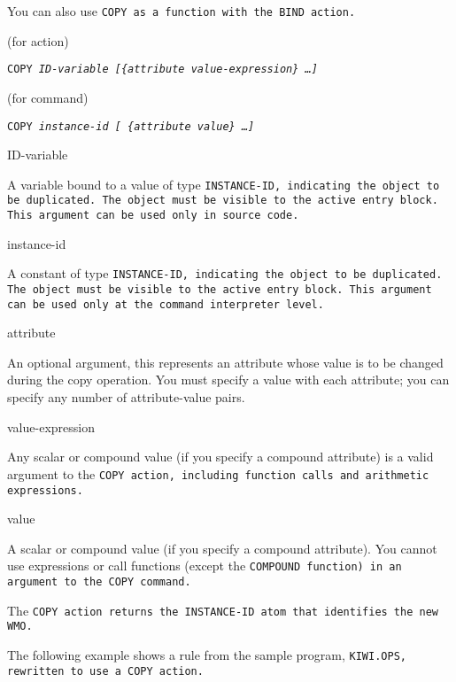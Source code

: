 You can also use \tt{COPY} as a function with the \tt{BIND} action.

\Format (for action)

\tt{COPY} \it{ID-variable} [\{\ct\it{attribute} \it{value-expression}\} \ldots]

\Format (for command)

\tt{COPY} \it{instance-id} [ \{\ct\it{attribute} \it{value}\} \ldots]

\begin{arguments}
\item[ID-variable]

  A variable bound to a value of type \tt{INSTANCE-ID}, indicating the
  object to be duplicated. The object must be visible to the active
  entry block. This argument can be used only in source code.

\item[instance-id]

  A constant of type \tt{INSTANCE-ID}, indicating the object to be
  duplicated. The object must be visible to the active entry
  block. This argument can be used only at the command interpreter
  level.

\item[attribute]

  An optional argument, this represents an attribute whose value is to
  be changed during the copy operation. You must specify a value with
  each attribute; you can specify any number of attribute-value pairs.

\item[value-expression]

  Any scalar or compound value (if you specify a compound attribute)
  is a valid argument to the \tt{COPY} action, including function
  calls and arithmetic expressions.

\item[value]

  A scalar or compound value (if you specify a compound
  attribute). You cannot use expressions or call functions (except the
  \tt{COMPOUND} function) in an argument to the \tt{COPY} command.
\end{arguments}

\ReturnValue

The \tt{COPY} action returns the \tt{INSTANCE-ID} atom that identifies
the new WMO.

\Example

The following example shows a rule from the sample program,
\tt{KIWI.OPS}, rewritten to use a \tt{COPY} action.


